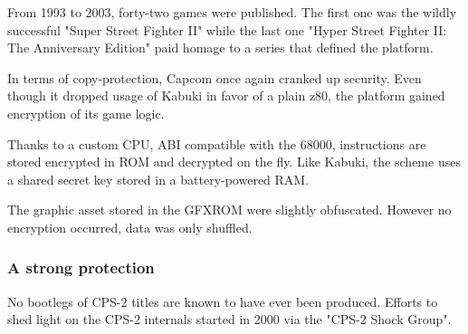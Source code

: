 From 1993 to 2003, forty-two games were published. The first one was the wildly successful "Super Street Fighter II" while the last one "Hyper Street Fighter II: The Anniversary Edition" paid homage to a series that defined the platform.

In terms of copy-protection, Capcom once again cranked up security. Even though it dropped usage of Kabuki in favor of a plain z80, the platform gained encryption of its game logic. 

Thanks to a custom CPU, ABI compatible with the 68000, instructions are stored encrypted in ROM and decrypted on the fly. Like Kabuki, the scheme uses a shared secret key stored in a battery-powered RAM.

The graphic asset stored in the GFXROM were slightly obfuscated. However no encryption occurred, data was only shuffled.

\subsubsection{A strong protection}

No bootlegs of CPS-2 titles are known to have ever been produced. Efforts to shed light on the CPS-2 internals started in 2000\cite{cps2rebirth} via the "CPS-2 Shock Group".

\pagebreak




